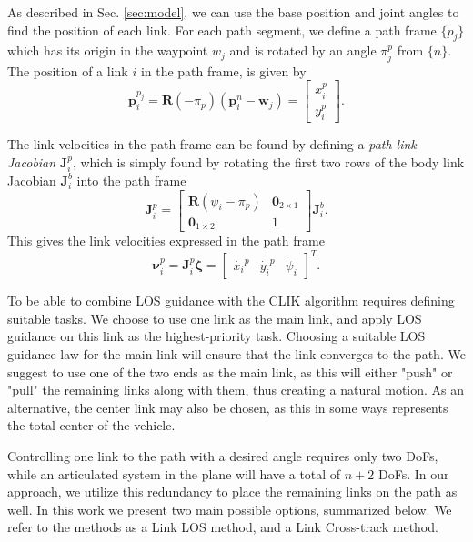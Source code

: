 \documentclass[../main.tex]{subfiles}
\begin{document}
As described in Sec. \ref{sec:model}, we can use the base position and joint angles to find the position of each link. For each path segment, we define a path frame $\{p_j\}$ which has its origin in the waypoint $w_j$ and is rotated  by an angle $\pi^{p}_j$ from $\{n\}$. The position of a link $i$ in the path frame, is given by
\begin{equation}
    \bm{p}_i^{p_j} = \bm{R}(-\pi_p) \left(\bm{p}_i^n - \bm{w}_j \right)
    =\begin{bmatrix}
        x_i^p \\ y_i^p
    \end{bmatrix}.
\end{equation}

The link velocities in the path frame can be found by defining a \emph{path link Jacobian} $\bm{J}^p_i$, which is simply found by rotating the first two rows of the body link Jacobian $\bm{J}^b_i$ into the path frame
\begin{equation}
    \label{eq:path_Jacobian}
    \bm{J}^p_i = \begin{bmatrix}
        \bm{R}(\psi_i - \pi_p) & \bm{0}_{2 \times 1} \\
        \bm{0}_{1 \times 2} & 1
    \end{bmatrix}
    \bm{J}^b_i.
\end{equation}
This gives the link velocities expressed in the path frame
\begin{equation}
    \label{eq:path_velocities}
    \bm{\nu}^p_{i} = \bm{J}^p_i \bm{\zeta} = \begin{bmatrix}
        \dot{x_i}^p & \dot{y_i}^p & \dot{\psi}_i
    \end{bmatrix}^T.
\end{equation}

To be able to combine LOS guidance with the CLIK algorithm requires defining suitable tasks. We choose to use one link as the main link, and apply LOS guidance on this link as the  highest-priority task. Choosing a suitable LOS guidance law for the main link will ensure that the link converges to the path. We suggest to use one of the two ends as the main link, as this will either "push" or "pull" the remaining links along with them, thus creating a natural motion. As an alternative, the center link may also be chosen, as this in some ways represents the total center of the vehicle.

Controlling one link to the path with a desired angle requires only two DoFs, while an articulated system in the plane will have a total of $n+2$ DoFs. In our approach, we utilize this redundancy to place the remaining links on the path as well. In this work we present two main possible options, summarized below. We refer to the methods as a Link LOS method, and a Link Cross-track method.
\end{document}
